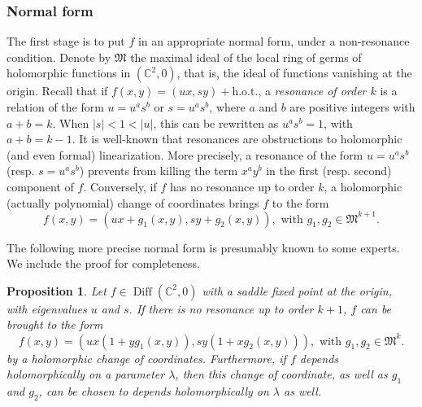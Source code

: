 \documentclass[11pt, oneside]{amsart}
\newcommand{\C}{\mathbb{C}}
\newcommand{\fkm}{\mathfrak{M}}
\newcommand{\abs}[1]{\left\vert#1\right\vert}
\newcommand{\cd}{{\C^2}}
\newcommand{\hot}{{\mathrm{h.o.t.}}}
\DeclareMathOperator{\Diff}{Diff}
\newtheorem{prop}{Proposition} [section]
\theoremstyle{remark}
\theoremstyle{definition}
\theoremstyle{theorem}
\newcommand{\commentaire}[1]{}
\begin{document}
\subsubsection{Normal form}  The first stage is to put $f$ in an appropriate normal form, under a non-resonance condition. 
Denote by $\fkm$ the maximal ideal of the local ring of germs of holomorphic functions in $(\cd, 0)$,
 that is, the 
ideal of functions vanishing at the origin.
Recall that if $f(x,y) = (ux, sy)+ \hot$, a \emph{resonance of order $k$} is a relation of the form 
$u = u^a s^b$ or $s = u^as^b$, where $a$ and $b$ are positive integers with $a+b = k$. When 
 $\abs{s}<1<\abs{u}$, this can be rewritten as $u^a s^b = 1$, with $a+b = k-1$. 
 It is well-known that resonances are obstructions to holomorphic (and even formal) linearization. 
 More precisely, a resonance of the form 
 $u = u^a s^b$ (resp.  $s = u^a s^b$) 
 prevents from killing the term $x^ay^b$ in the first (resp. second) 
 component of $f$. Conversely, if $f$ has no resonance up to order $k$,   
 a holomorphic (actually polynomial) change of coordinates brings $f$ to the form 
\begin{equation}\label{eq:form_f}
f(x,y) = (u x+ g_1(x,y), sy+g_2(x,y)), \text{ with } g_1, g_2\in \fkm ^{k+1}.
\end{equation}

The following more precise normal form  is presumably  
 known to some  experts. We include the proof for completeness. 

\begin{prop}\label{prop:sternberg}
Let $f\in \Diff(\cd,0)$ with a saddle fixed point at the origin,
 with eigenvalues $u$ and $s$. If there is no resonance up to order $k+1$, $f$ can be brought to the form 
\begin{equation}\tag{$\star_k$}
f(x,y)  =  (ux(1+ yg_1(x,y)), sy(1+xg_2(x,y))), \text{ with } g_1, g_2\in \fkm^k. 
\end{equation}
by a holomorphic change of coordinates. 
\commentaire{Precision added for \S 4.1.3 (cf. Exposition Rmk \#3). Several comments added in the proof about this. }Furthermore, if $f$ depends holomorphically on a parameter $\lambda$, then this change of coordinate, as well as $g_1$ and $g_2$,  can be chosen to depends holomorphically on $\lambda$ as well. 
\end{prop}
\end{document}
